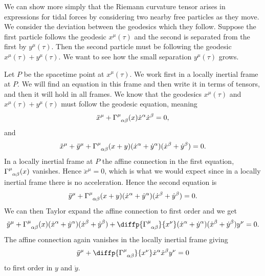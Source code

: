 \documentclass[fleqn]{NotesClass}
\newcommand*{\christoffel}[3]{\tensor{\Gamma}{^{#1}_{{#2}{#3}}}}
\begin{document}
    We can show more simply that the Riemann curvature tensor arises in expressions for tidal forces by considering two nearby free particles as they move.
    We consider the deviation between the geodesics which they follow.
    Suppose the first particle follows the geodesic \(x^\mu(\tau)\) and the second is separated from the first by \(y^\mu(\tau)\).
    Then the second particle must be following the geodesic \(x^\mu(\tau) + y^\mu(\tau)\).
    We want to see how the small separation \(y^\mu(\tau)\) grows.
    
    Let \(P\) be the spacetime point at \(x^\mu(\tau)\).
    We work first in a locally inertial frame at \(P\).
    We will find an equation in this frame and then write it in terms of tensors, and then it will hold in all frames.
    We know that the geodesics \(x^\mu(\tau)\) and \(x^\mu(\tau) + y^\mu(\tau)\) must follow the geodesic equation, meaning
    \begin{equation}
        \ddot{x}^\mu + \christoffel{\mu}{\alpha}{\beta}(x)\dot{x}^\alpha\dot{x}^\beta = 0,
    \end{equation}
    and
    \begin{equation}
        \ddot{x}^\mu + \ddot{y}^\mu + \christoffel{\mu}{\alpha}{\beta}(x + y)(\dot{x}^\alpha + \dot{y}^\alpha)(\dot{x}^\beta + \dot{y}^\beta) = 0.
    \end{equation}
    In a locally inertial frame at \(P\) the affine connection in the first equation, \(\christoffel{\mu}{\alpha}{\beta}(x)\) vanishes.
    Hence \(\ddot{x}^\mu = 0\), which is what we would expect since in a locally inertial frame there is no acceleration.
    Hence the second equation is
    \begin{equation}
        \ddot{y}^\mu + \christoffel{\mu}{\alpha}{\beta}(x + y)(\dot{x}^\alpha + \dot{y}^\alpha)(\dot{x}^\beta + \dot{y}^\beta) = 0.
    \end{equation}
    We can then Taylor expand the affine connection to first order and we get
    \begin{equation}
        \ddot{y}^\mu + \christoffel{\mu}{\alpha}{\beta}(x)(\dot{x}^\alpha + \dot{y}^\alpha)(\dot{x}^\beta + \dot{y}^\beta) + \diffp{\christoffel{\mu}{\alpha}{\beta}}{x^\nu}(\dot{x}^\alpha + \dot{y}^\alpha)(\dot{x}^\beta + \dot{y}^\beta) y^\nu = 0.
    \end{equation}
    The affine connection again vanishes in the locally inertial frame giving
    \begin{equation}\label{eqn:geodesic deviation derivation}
        \ddot{y}^\mu + \diffp{\christoffel{\mu}{\alpha}{\beta}}{x^\nu} \dot{x}^\alpha\dot{x}^\beta y^\nu = 0
    \end{equation}
    to first order in \(y\) and \(\dot{y}\).
    
\end{document}
